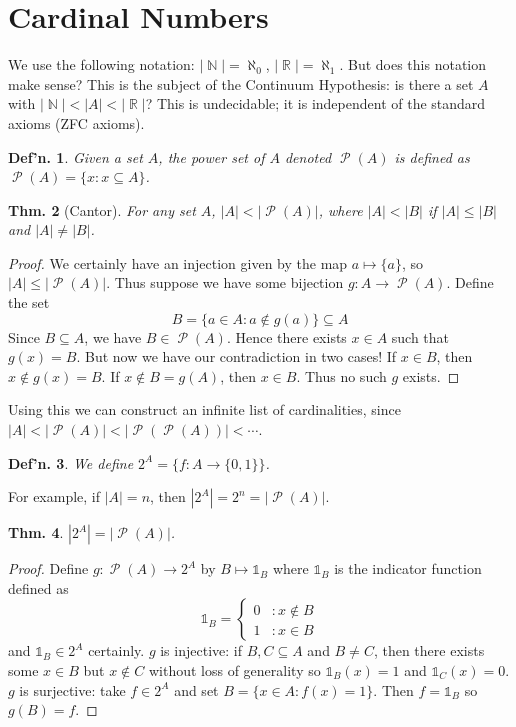 \documentclass[12pt, a4paper]{book}
\DeclareMathOperator{\N}{\mathbb{N}}
\DeclareMathOperator{\R}{\mathbb{R}}
\DeclareMathOperator{\Ps}{\mathcal{P}}
\newtheorem{theorem}{Thm.}[section]
\newtheorem{definition}[theorem]{Def'n.}
\theoremstyle{nonumberplain}
\newtheorem{proof}{Proof}
\begin{document}
\section{Cardinal Numbers}
We use the following notation: $|\N|=\aleph_0$, $|\R|=\aleph_1$. But does this notation make sense? This is the subject of
the Continuum Hypothesis: is there a set $A$ with $|\N|<|A|<|\R|$? This is undecidable; it is independent of the standard
axioms (ZFC axioms).
\begin{definition}
    Given a set $A$, the power set of $A$ denoted $\Ps(A)$ is defined as $\Ps(A)=\{x:x\subseteq A\}$.
\end{definition}
\begin{theorem}[Cantor]
    For any set $A$, $|A|<|\Ps(A)|$, where $|A|<|B|$ if $|A|\leq|B|$ and $|A|\neq|B|$.
\end{theorem}
\begin{proof}
    We certainly have an injection given by the map $a\mapsto\{a\}$, so $|A|\leq|\Ps(A)|$. Thus suppose we have
    some bijection $g:A\to\Ps(A)$. Define the set
    \[B=\{a\in A:a\notin g(a)\}\subseteq A\]
    Since $B\subseteq A$, we have $B\in\Ps(A)$. Hence there exists $x\in A$ such that $g(x)=B$. But now we have our contradiction
    in two cases! If $x\in B$, then $x\notin g(x)=B$. If $x\notin B=g(A)$, then $x\in B$. Thus no such $g$ exists.
\end{proof}
Using this we can construct an infinite list of cardinalities, since $|A|<|\Ps(A)|<|\Ps(\Ps(A))|<\cdots$.
\begin{definition}
    We define $2^A=\{f:A\to\{0,1\}\}$.
\end{definition}
For example, if $|A|=n$, then $|2^A|=2^n=|\Ps(A)|$.
\begin{theorem}
    $|2^A|=|\Ps(A)|$.
\end{theorem}
\begin{proof}
    Define $g:\Ps(A)\to 2^A$ by $B\mapsto \mathds{1}_B$ where $\mathds{1}_B$ is the indicator function defined as
    \[\mathds{1}_B=
    \begin{cases}
        0 &:x\notin B\\
        1 &:x\in B
    \end{cases}
    \]
    and $\mathds{1}_B\in 2^A$ certainly. $g$ is injective: if $B,C\subseteq A$ and $B\neq C$, then there exists
    some $x\in B$ but $x\notin C$ without loss of generality so $\mathds{1}_B(x)=1$ and $\mathds{1}_C(x)=0$. $g$
    is surjective: take $f\in 2^A$ and set $B=\{x\in A:f(x)=1\}$. Then $f=\mathds{1}_B$ so $g(B)=f$.
\end{proof}
\end{document}
